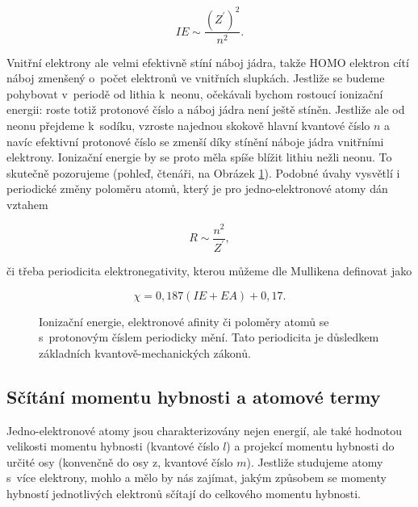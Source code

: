 \begin{equation}
IE \sim \frac{(Z^{\prime})^2}{n^2}.
\label{rov:VE-60}
\end{equation}

\noindent Vnitřní elektrony ale velmi efektivně stíní náboj jádra, takže HOMO elektron cítí náboj zmenšený o~počet elektronů ve vnitřních slupkách. Jestliže se budeme pohybovat v~periodě od lithia k~neonu, očekávali bychom rostoucí ionizační energii: roste totiž protonové číslo a náboj jádra není ještě stíněn. Jestliže ale od neonu přejdeme k~sodíku, vzroste najednou skokově hlavní kvantové číslo $n$ a navíc efektivní protonové číslo se zmenší díky stínění náboje jádra vnitřními elektrony. Ionizační energie by se proto měla spíše blížit lithiu nežli neonu. To skutečně pozorujeme (pohleď, čtenáři, na Obrázek \ref{obr:Period}). Podobné úvahy vysvětlí i periodické změny poloměru atomů, který je pro jedno-elektronové atomy dán vztahem

\begin{equation}
R \sim \frac{n^2}{Z^{\prime}},
\label{rov:VE-61}
\end{equation}

\noindent či třeba periodicita elektronegativity, kterou můžeme dle Mullikena definovat jako

\begin{equation}
\chi = 0{,}187 (IE + EA) + 0{,}17.
\label{rov:VE-62}
\end{equation}

\begin{figure} [ht]
\centering
\caption[Periodicita vlastností prvků]{Ionizační energie, elektronové afinity či poloměry atomů se s~protonovým číslem periodicky mění. Tato periodicita je důsledkem základních kvantově-mechanických zákonů.}
\label{obr:Period}
\end{figure}


\subsection{Sčítání momentu hybnosti a atomové termy}
Jedno-elektronové atomy jsou charakterizovány nejen energií, ale také hodnotou velikosti momentu hybnosti (kvantové číslo $l$) a projekcí momentu hybnosti do určité osy (konvenčně do osy z, kvantové číslo $m$). Jestliže studujeme atomy s~více elektrony, mohlo a mělo by nás zajímat, jakým způsobem se momenty hybností jednotlivých elektronů sčítají do celkového momentu hybnosti.


